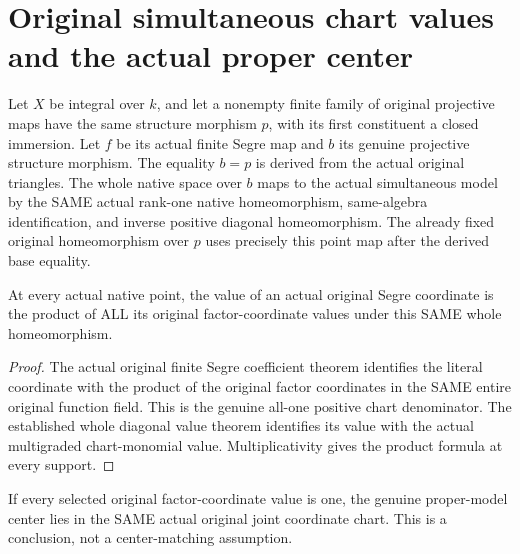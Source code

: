 \section{Original simultaneous chart values and the actual proper center}
\begin{definition}\label{def:original-family-segre-base-homeomorphism}
\leanok
{}
Let $X$ be integral over $k$, and let a nonempty finite family of original projective maps have the same structure morphism $p$, with its first constituent a closed immersion. Let $f$ be its actual finite Segre map and $b$ its genuine projective structure morphism. The equality $b=p$ is derived from the actual original triangles. The whole native space over $b$ maps to the actual simultaneous model by the SAME actual rank-one native homeomorphism, same-algebra identification, and inverse positive diagonal homeomorphism. The already fixed original homeomorphism over $p$ uses precisely this point map after the derived base equality.
\end{definition}
\begin{theorem}\label{thm:original-family-native-coordinate-value}
\leanok
{}
At every actual native point, the value of an actual original Segre coordinate is the product of ALL its original factor-coordinate values under this SAME whole homeomorphism.
\end{theorem}
\begin{proof}
The actual original finite Segre coefficient theorem identifies the literal coordinate with the product of the original factor coordinates in the SAME entire original function field. This is the genuine all-one positive chart denominator. The established whole diagonal value theorem identifies its value with the actual multigraded chart-monomial value. Multiplicativity gives the product formula at every support.
\end{proof}
\begin{theorem}\label{thm:original-family-native-proper-center-chart}
\leanok
{}
If every selected original factor-coordinate value is one, the genuine proper-model center lies in the SAME actual original joint coordinate chart. This is a conclusion, not a center-matching assumption.
\end{theorem}
